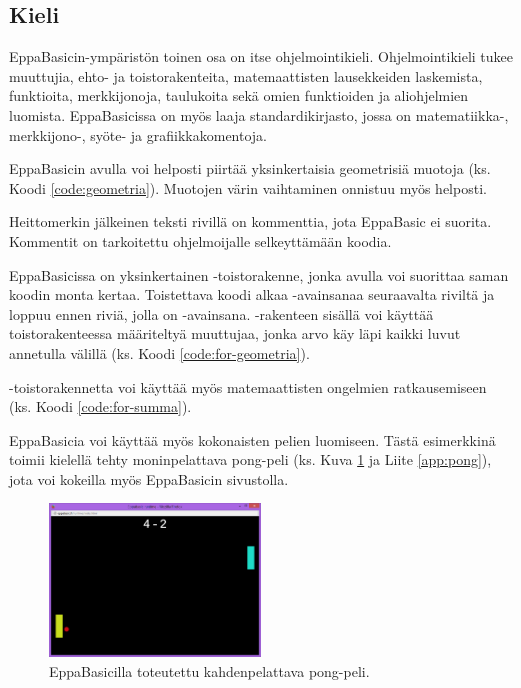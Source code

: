 \subsection{Kieli}
EppaBasicin-ympäristön toinen osa on
itse ohjelmointikieli.
Ohjelmointikieli tukee
muuttujia,
ehto- ja toistorakenteita,
matemaattisten lausekkeiden laskemista,
funktioita,
merkkijonoja,
taulukoita sekä
omien funktioiden
ja aliohjelmien luomista.
EppaBasicissa on myös
laaja standardikirjasto,
jossa on matematiikka-,
merkkijono-, syöte- ja
grafiikkakomentoja.

EppaBasicin avulla voi helposti
piirtää yksinkertaisia geometrisiä
muotoja (ks. Koodi \ref{code:geometria}).
Muotojen värin vaihtaminen
onnistuu myös helposti.

Heittomerkin  jälkeinen
teksti rivillä on kommenttia,
jota EppaBasic ei suorita.
Kommentit on tarkoitettu
ohjelmoijalle selkeyttämään
koodia.


EppaBasicissa on yksinkertainen
-toistorakenne, jonka
avulla voi suorittaa saman
koodin monta kertaa.
Toistettava koodi alkaa
-avainsanaa seuraavalta
riviltä ja loppuu ennen riviä,
jolla on -avainsana.
-rakenteen sisällä voi
käyttää toistorakenteessa määriteltyä
muuttujaa, jonka arvo käy läpi
kaikki luvut annetulla välillä
(ks. Koodi \ref{code:for-geometria}).


-toistorakennetta voi
käyttää myös matemaattisten 
ongelmien ratkausemiseen
(ks. Koodi \ref{code:for-summa}).


EppaBasicia voi käyttää myös
kokonaisten pelien luomiseen.
Tästä esimerkkinä toimii
kielellä tehty moninpelattava
pong-peli
(ks. Kuva \ref{img:pong} ja Liite \ref{app:pong}),
jota voi kokeilla myös
EppaBasicin sivustolla.

\begin{figure}[h]
    \centering
    \includegraphics[width=0.5\textwidth]{pong}
    \caption{EppaBasicilla toteutettu kahdenpelattava pong-peli.}
    \label{img:pong}
\end{figure}